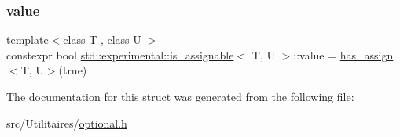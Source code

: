 \subsubsection{\texorpdfstring{value}{value}}
{\footnotesize\ttfamily template$<$class T , class U $>$ \\
constexpr bool \mbox{\hyperlink{structstd_1_1experimental_1_1is__assignable}{std\+::experimental\+::is\+\_\+assignable}}$<$ T, U $>$\+::value = \mbox{\hyperlink{structstd_1_1experimental_1_1is__assignable_af8698cf73e8d40f6af5bafa292f9e532}{has\+\_\+assign}}$<$T, U$>$(true)\hspace{0.3cm}{\ttfamily [static]}}



The documentation for this struct was generated from the following file\+:\begin{DoxyCompactItemize}
\item 
src/\+Utilitaires/\mbox{\hyperlink{optional_8h}{optional.\+h}}\end{DoxyCompactItemize}

